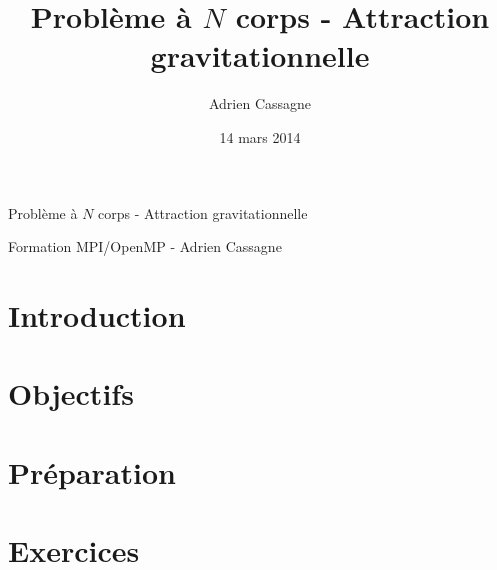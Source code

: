 \documentclass[a4paper,11pt,answers,11pt]{exam}
\title{Problème à $N$ corps - Attraction gravitationnelle}
\author{Adrien Cassagne}
\date{14 mars 2014}
\begin{document}
\begin{title}
\noindent{}
\begin{center}
	{\Large{Problème à $N$ corps - Attraction gravitationnelle}}\\
\end{center}
\begin{center}
	{\footnotesize{Formation MPI/OpenMP - Adrien {\sc Cassagne}}}
\end{center}
\end{title}

\setcounter{page}{1}
\section {Introduction}


\section {Objectifs}


\section {Préparation}


\section {Exercices}

\end{document}
